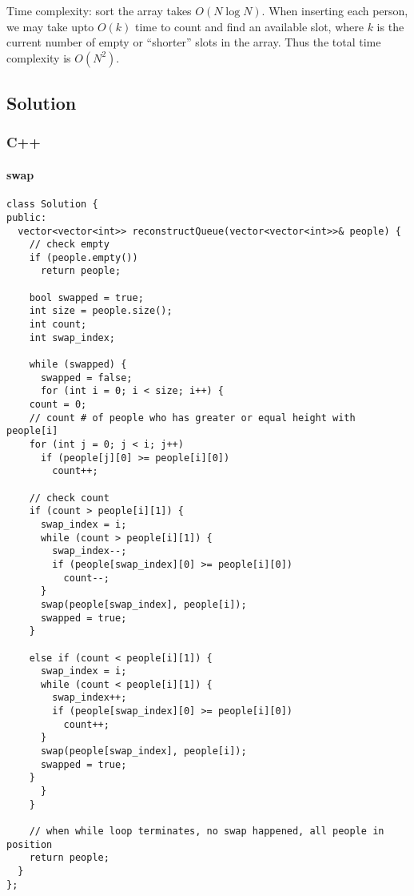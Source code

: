 \documentclass[11pt]{article}
\begin{document}
Time complexity: sort the array takes \(O(N\log{N})\). When inserting each person, we may take upto \(O(k)\) time to count and find an available slot, where \(k\) is the current number of empty or ``shorter'' slots in the array. Thus the total time complexity is \(O(N^2)\).
\subsection{Solution}
\label{sec:orgd079077}
\subsubsection{C++}
\label{sec:org30a2cce}
\paragraph{swap}
\label{sec:org2054805}
\begin{verbatim}
class Solution {
public:
  vector<vector<int>> reconstructQueue(vector<vector<int>>& people) {
    // check empty 
    if (people.empty())
      return people;

    bool swapped = true;
    int size = people.size();
    int count;
    int swap_index;

    while (swapped) {
      swapped = false;
      for (int i = 0; i < size; i++) {
	count = 0;
	// count # of people who has greater or equal height with people[i]
	for (int j = 0; j < i; j++)
	  if (people[j][0] >= people[i][0])
	    count++;

	// check count 
	if (count > people[i][1]) {
	  swap_index = i;
	  while (count > people[i][1]) {
	    swap_index--;
	    if (people[swap_index][0] >= people[i][0])
	      count--;
	  }
	  swap(people[swap_index], people[i]);
	  swapped = true;
	}

	else if (count < people[i][1]) {
	  swap_index = i;
	  while (count < people[i][1]) {
	    swap_index++;
	    if (people[swap_index][0] >= people[i][0])
	      count++;
	  }
	  swap(people[swap_index], people[i]);
	  swapped = true;
	}        
      }
    }

    // when while loop terminates, no swap happened, all people in position
    return people;
  }
};
\end{verbatim}
\end{document}
